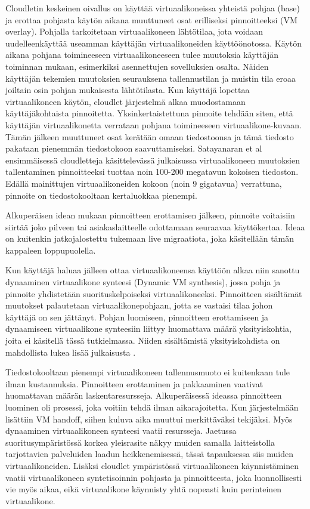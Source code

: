 Cloudletin keskeinen oivallus on käyttää virtuaalikoneissa yhteistä pohjaa (base) ja erottaa pohjasta käytön aikana muuttuneet osat erilliseksi pinnoitteeksi (VM overlay).
Pohjalla tarkoitetaan virtuaalikoneen lähtötilaa, jota voidaan uudelleenkäyttää useamman käyttäjän virtuaalikoneiden käyttöönotossa.
Käytön aikana pohjana toimineeseen virtuaalikoneeseen tulee muutoksia käyttäjän toiminnan mukaan, esimerkiksi asennettujen sovelluksien osalta. 
Näiden käyttäjän tekemien muutoksien seurauksena tallennustilan ja muistin tila eroaa joiltain osin pohjan mukaisesta lähtötilasta. 
Kun käyttäjä lopettaa virtuaalikoneen käytön, cloudlet järjestelmä alkaa muodostamaan käyttäjäkohtaista pinnoitetta. 
Yksinkertaistettuna pinnoite tehdään siten, että käyttäjän virtuaalikonetta verrataan pohjana toimineeseen virtuaalikone-kuvaan. Tämän jälkeen muuttuneet osat kerätään omaan tiedostoonsa ja tämä tiedosto pakataan pienemmän tiedostokoon saavuttamiseksi.
Satayanaran et al ensimmäisessä cloudletteja käsittelevässä julkaisussa \cite{satya09} virtuaalikoneen muutoksien tallentaminen pinnoitteeksi tuottaa noin 100-200 megatavun kokoisen tiedoston.
Edällä mainittujen virtuaalikoneiden kokoon (noin 9 gigatavua) verrattuna, pinnoite on tiedostokooltaan kertaluokkaa pienempi.

Alkuperäisen idean mukaan pinnoitteen erottamisen jälkeen, pinnoite voitaisiin siirtää joko pilveen tai asiakaslaitteelle odottamaan seuraavaa käyttökertaa. Ideaa on kuitenkin jatkojalostettu tukemaan live migraatiota, joka käsitellään tämän kappaleen loppupuolella.

Kun käyttäjä haluaa jälleen ottaa virtuaalikoneensa käyttöön alkaa niin sanottu dynaaminen virtuaalikone synteesi (Dynamic VM synthesis), jossa pohja ja pinnoite yhdistetään suorituskelpoiseksi virtuaalikoneeksi.
Pinnoitteen sisältämät muutokset palautetaan virtuaalikonepohjaan, jotta se vastaisi tilaa johon käyttäjä on sen jättänyt. Pohjan luomiseen, pinnoitteen erottamiseen ja dynaamiseen virtuaalikone synteesiin liittyy huomattava määrä yksityiskohtia, joita ei käsitellä tässä tutkielmassa. Niiden sisältämistä yksityiskohdista on mahdollista lukea lisää julkaisusta \cite{ha2013just}. 

Tiedostokooltaan pienempi virtuaalikoneen tallennusmuoto ei kuitenkaan tule ilman kustannuksia. Pinnoitteen erottaminen ja pakkaaminen vaativat huomattavan määrän laskentaresursseja. Alkuperäisessä ideassa pinnoitteen luominen oli prosessi, joka voitiin tehdä ilman aikarajoitetta. Kun järjestelmään lisättiin VM handoff, siihen kuluva aika muuttui merkittäväksi tekijäksi. Myös dynaaminen virtuaalikoneen synteesi vaatii resursseja. Jaetussa suoritusympäristössä korkea yleisrasite näkyy muiden samalla laitteistolla tarjottavien palveluiden laadun heikkenemisessä, tässä tapauksessa siis muiden virtuaalikoneiden.
Lisäksi cloudlet ympäristössä virtuaalikoneen käynnistäminen vaatii virtuaalikoneen syntetisoinnin pohjasta ja pinnoitteesta, joka luonnollisesti vie myös aikaa, eikä virtuaalikone käynnisty yhtä nopeasti kuin perinteinen virtuaalikone. 

